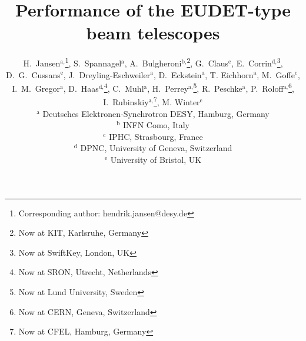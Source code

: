 \documentclass[a4paper,10pt]{scrartcl}
\makeatletter
\renewcommand{\maketitle}{\bgroup\setlength{\parindent}{0pt}
\begin{flushleft}
  \vspace*{10mm}
  \textbf{\huge\sffamily\@title}
  \vspace{5mm}
   
  \large \@author
\end{flushleft}\egroup
}
\makeatother
\begin{document}
\linenumbers








\title{Performance of the EUDET-type\\ beam telescopes}
\author{
H.~Jansen${}^{\textrm{a,}}$\footnote[*]{Corresponding author: hendrik.jansen@desy.de},
S.~Spannagel${}^{\textrm{a}}$, 
A.~Bulgheroni${}^{\textrm{b,}}$\footnote{Now at KIT, Karlsruhe, Germany},
G.~Claus${}^{\textrm{c}}$,
E.~Corrin${}^{\textrm{d,}}$\footnote{Now at SwiftKey, London, UK},
D.~G.~Cussans${}^{\textrm{e}}$,
J.~Dreyling-Eschweiler${}^{\textrm{a}}$, 
D.~Eckstein${}^{\textrm{a}}$, 
T. Eichhorn${}^{\textrm{a}}$, 
M.~Goffe${}^{\textrm{c}}$,
I.~M.~Gregor${}^{\textrm{a}}$, 
D.~Haas${}^{\textrm{d,}}$\footnote{Now at SRON, Utrecht, Netherlands},
C.~Muhl${}^{\textrm{a}}$,
H.~Perrey${}^{\textrm{a,}}$\footnote{Now at Lund University, Sweden}, 
R.~Peschke${}^{\textrm{a}}$, 
P.~Roloff${}^{\textrm{a,}}$\footnote{Now at CERN, Geneva, Switzerland}, 
I.~Rubinskiy${}^{\textrm{a,}}$\footnote{Now at CFEL, Hamburg, Germany}, 
M. Winter${}^{\textrm{c}}$\\
\vspace{3mm}
${}^{\textrm{a}}$ Deutsches Elektronen-Synchrotron DESY, Hamburg, Germany\\
${}^{\textrm{b}}$ INFN Como, Italy\\
${}^{\textrm{c}}$ IPHC, Strasbourg, France\\
${}^{\textrm{d}}$ DPNC, University of Geneva, Switzerland\\
${}^{\textrm{e}}$ University of Bristol, UK
}
\maketitle
\end{document}
